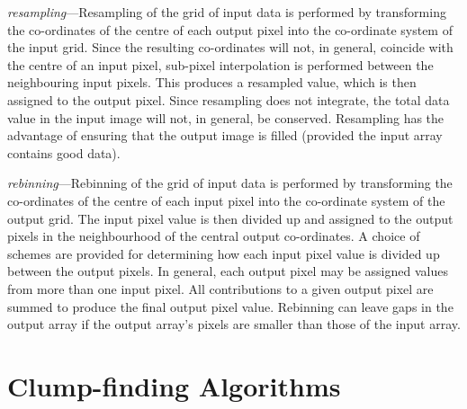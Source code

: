 \documentclass[11pt,oneside,chapters]{starlink}
\begin{document}
\emph{resampling}---Resampling of the grid of input data is performed
by transforming the co-ordinates of the centre of each output pixel
into the co-ordinate system of the input grid. Since the resulting
co-ordinates will not, in general, coincide with the centre of an
input pixel, sub-pixel interpolation is performed between the
neighbouring input pixels. This produces a resampled value, which is
then assigned to the output pixel.  Since resampling does not
integrate, the total data value in the input image will not, in
general, be conserved.  Resampling has the advantage of ensuring that
the output image is filled (provided the input array contains good
data).


\emph{rebinning}---Rebinning of the grid of input data is performed by
transforming the co-ordinates of the centre of each input pixel
into the co-ordinate system of the output grid.
The input pixel value is then divided up and assigned to the
output pixels in the neighbourhood of the central output
co-ordinates. A choice of schemes are provided for determining
how each input pixel value is divided up between the output
pixels. In general, each output pixel may be assigned values
from more than one input pixel. All contributions to a given
output pixel are summed to produce the final output pixel value.
Rebinning can leave gaps in the output array if the output
array's pixels are smaller than those of the input array.

\newpage
\chapter{Clump-finding Algorithms}
\label{app:clumpfind}
\end{document}
